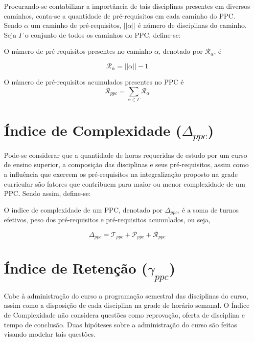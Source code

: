\documentclass[a4paper, 12pt]{article}
\begin{document}
Procurando-se contabilizar a importância de tais disciplinas presentes em diversos caminhos, conta-se a quantidade de pré-requisitos em cada 
caminho do PPC. Sendo $\alpha$ um caminho de pré-requisitos, $||\alpha||$ é número de disciplinas do caminho. Seja $\Gamma$ o conjunto de todos 
os caminhos do PPC, define-se:

\begin{definicao}
O número de pré-requisitos presentes no caminho $\alpha$, denotado por $\mathcal{R}_\alpha$, é

$$ \mathcal{R}_\alpha = ||\alpha|| - 1 $$
\end{definicao}

\begin{definicao}
O número de pré-requisitos acumulados presentes no PPC é
$$ \mathcal{R}_{ppc} = \sum_{\alpha \in \Gamma} \mathcal{R}_\alpha $$
\end{definicao}

\section*{Índice de Complexidade ($\Delta_{ppc}$)}
Pode-se considerar que a quantidade de horas requeridas de estudo por um curso de ensino superior, a composição das disciplinas e seus pré-requisitos, assim 
como a influência que exercem os pré-requisitos na integralização proposto na grade curricular são fatores que contribuem para maior ou menor complexidade 
de um PPC. Sendo assim, define-se: 

\begin{definicao}
O índice de complexidade de um PPC, denotado por $\Delta_{ppc}$, é a soma de turnos efetivos, peso dos pré-requisitos e pré-requisitos acumulados, ou seja,

$$\Delta_{ppc} = \mathcal{T}_{ppc} + \mathcal{P}_{ppc} + \mathcal{R}_{ppc}$$
\end{definicao}

\section*{Índice de Retenção ($\gamma_{ppc}$)}

Cabe à administração do curso a programação semestral das disciplinas do curso, assim como a disposição de cada disciplina na grade de horário semanal. O 
Índice de Complexidade não considera questões como reprovação, oferta de disciplina e tempo de conclusão. Duas hipóteses sobre a administração do curso 
são feitas visando modelar tais questões.
\end{document}
